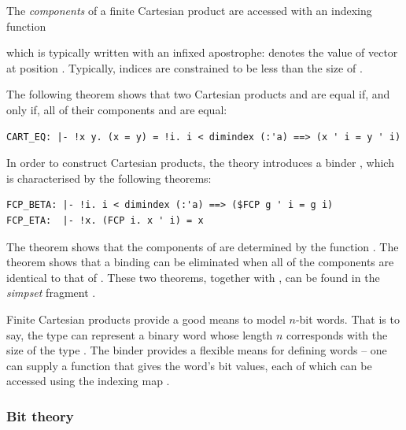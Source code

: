 {The \emph{components} of a finite Cartesian product are accessed with an
indexing function
which is typically written with an infixed apostrophe:
 denotes the value of vector  at position .
Typically, indices are constrained to be less than the size of .

The following theorem shows that two Cartesian products  and
 are equal if, and only if, all of their components  and
 are equal:
\begin{hol}
\begin{verbatim}
CART_EQ: |- !x y. (x = y) = !i. i < dimindex (:'a) ==> (x ' i = y ' i)
\end{verbatim}
\end{hol}

In order to construct Cartesian products, the theory  introduces a
binder , which is characterised by the following theorems:
\begin{hol}
\begin{verbatim}
FCP_BETA: |- !i. i < dimindex (:'a) ==> ($FCP g ' i = g i)
FCP_ETA:  |- !x. (FCP i. x ' i) = x
\end{verbatim}
\end{hol}
The theorem  shows that the components of  are
determined by the function .  The theorem
 shows that a binding can be eliminated when all of the components
are identical to that of .
These two theorems, together with , can be found in the
\emph{simpset} fragment .

Finite Cartesian products provide a good means to model $n$-bit words.  That is
to say, the type  can represent a binary word whose length $n$
corresponds with the size of the type .  The binder 
provides a flexible means for defining words -- one can supply a function
 that gives the word's bit values, each of which can be accessed using the indexing map .

\subsubsection{Bit theory}

}
